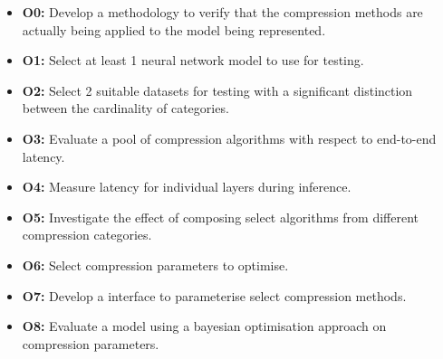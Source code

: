 \documentclass[../Dissertation.tex]{subfiles}
\begin{document}
\begin{itemize}
    \item \textbf{O0:}\label{obj:VerifyComp} Develop a methodology to verify that the compression methods are actually being applied to the model being represented.
    \item \textbf{O1:}\label{obj:ModelSel} Select at least 1 neural network model to use for testing.
    \item \textbf{O2:}\label{obj:DataSel} Select 2 suitable datasets for testing with a significant distinction between the cardinality of categories.
    \item \textbf{O3:}\label{obj:EvalE2E} Evaluate a pool of compression algorithms with respect to end-to-end latency.
    \item \textbf{O4:}\label{obj:EvalLayer} Measure latency for individual layers during inference.
    \item \textbf{O5:}\label{obj:EvalComp} Investigate the effect of composing select algorithms from different compression categories. 
    \item \textbf{O6:}\label{obj:ParaSel} Select compression parameters to optimise.
    \item \textbf{O7:}\label{obj:CompPara} Develop a interface to parameterise select compression methods.
    \item \textbf{O8:}\label{obj:TestOpt} Evaluate a model using a bayesian optimisation approach on compression parameters.
\end{itemize}
\end{document}
